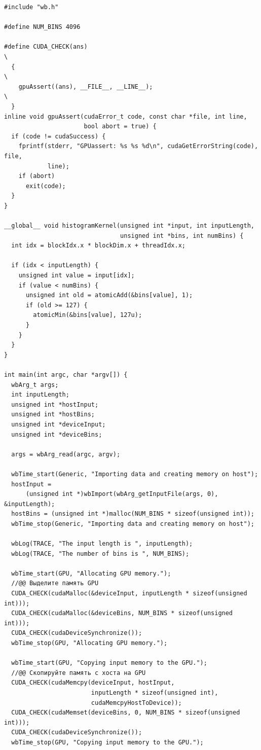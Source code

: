 \documentclass[14pt]{extarticle}
\newenvironment{code}{\captionsetup{type=listing, belowskip=-14pt plus 3pt minus 0pt}}{}
\begin{document}
\begin{code}    
\caption{Содержание rvs\_laboratories\_7/rvs\_laboratories\_7.cu\label{lst:main}}
\begin{verbatim}
#include "wb.h"

#define NUM_BINS 4096

#define CUDA_CHECK(ans)                                                        \
  {                                                                            \
    gpuAssert((ans), __FILE__, __LINE__);                                      \
  }
inline void gpuAssert(cudaError_t code, const char *file, int line,
                      bool abort = true) {
  if (code != cudaSuccess) {
    fprintf(stderr, "GPUassert: %s %s %d\n", cudaGetErrorString(code), file,
            line);
    if (abort)
      exit(code);
  }
}

__global__ void histogramKernel(unsigned int *input, int inputLength,
                                unsigned int *bins, int numBins) {
  int idx = blockIdx.x * blockDim.x + threadIdx.x;

  if (idx < inputLength) {
    unsigned int value = input[idx];
    if (value < numBins) {
      unsigned int old = atomicAdd(&bins[value], 1);
      if (old >= 127) {
        atomicMin(&bins[value], 127u);
      }
    }
  }
}

int main(int argc, char *argv[]) {
  wbArg_t args;
  int inputLength;
  unsigned int *hostInput;
  unsigned int *hostBins;
  unsigned int *deviceInput;
  unsigned int *deviceBins;

  args = wbArg_read(argc, argv);

  wbTime_start(Generic, "Importing data and creating memory on host");
  hostInput =
      (unsigned int *)wbImport(wbArg_getInputFile(args, 0), &inputLength);
  hostBins = (unsigned int *)malloc(NUM_BINS * sizeof(unsigned int));
  wbTime_stop(Generic, "Importing data and creating memory on host");

  wbLog(TRACE, "The input length is ", inputLength);
  wbLog(TRACE, "The number of bins is ", NUM_BINS);

  wbTime_start(GPU, "Allocating GPU memory.");
  //@@ Выделите память GPU
  CUDA_CHECK(cudaMalloc(&deviceInput, inputLength * sizeof(unsigned int)));
  CUDA_CHECK(cudaMalloc(&deviceBins, NUM_BINS * sizeof(unsigned int)));
  CUDA_CHECK(cudaDeviceSynchronize());
  wbTime_stop(GPU, "Allocating GPU memory.");

  wbTime_start(GPU, "Copying input memory to the GPU.");
  //@@ Скопируйте память с хоста на GPU
  CUDA_CHECK(cudaMemcpy(deviceInput, hostInput,
                        inputLength * sizeof(unsigned int),
                        cudaMemcpyHostToDevice));
  CUDA_CHECK(cudaMemset(deviceBins, 0, NUM_BINS * sizeof(unsigned int)));
  CUDA_CHECK(cudaDeviceSynchronize());
  wbTime_stop(GPU, "Copying input memory to the GPU.");


\end{verbatim}
\end{code}
\end{document}
